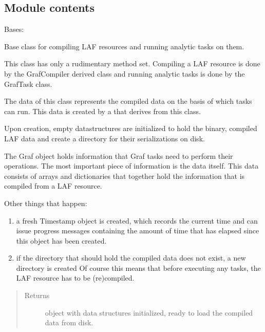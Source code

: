 \documentclass[letterpaper,10pt,english]{sphinxmanual}
\begin{document}
\subsection{Module contents}
\label{graf/graf:module-graf}\label{graf/graf:module-contents}

\begin{fulllineitems}
\label{graf/graf:graf.Graf}
Bases: 

Base class for compiling LAF resources and running analytic tasks on them.

This class has only a rudimentary method set. Compiling a LAF resource is done by the GrafCompiler derived class
and running analytic tasks is done by the GrafTask class.

The data of this class represents the compiled data on the basis of which tasks can run.
This data is created by a {\hyperref[graf/graf:graf.compiler.GrafCompiler]{}} that derives from this class.

Upon creation, empty datastructures are initialized to hold the binary,
compiled LAF data and create a directory for their serializations on disk.

The Graf object holds information that Graf tasks need to perform their operations.
The most important piece of information is the data itself.
This data consists of arrays and dictionaries that together hold the information that is compiled from a LAF resource.

Other things that happen:
\begin{enumerate}
\item {} 
a fresh Timestamp object is created, which records the current time and can issue progress messages containing the amount
of time that has elapsed since this object has been created.

\item {} 
if the directory that should hold the compiled data does not exist,
a new directory is created Of course this means that before executing any tasks,
the LAF resource has to be (re)compiled.

\end{enumerate}
\begin{quote}\begin{description}
\item[{Returns}] \leavevmode
object with data structures initialized, ready to load the compiled data from disk.


\end{description}
\end{quote}
\end{fulllineitems}
\end{document}
